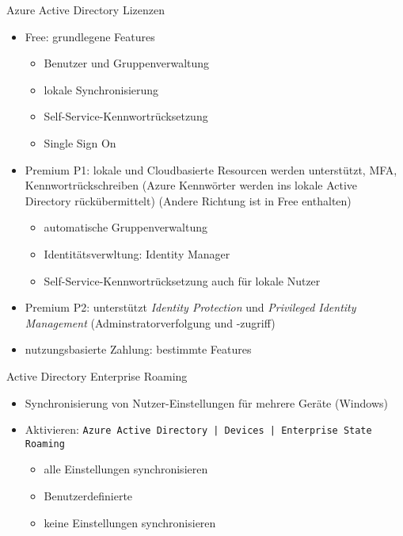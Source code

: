 
\begin{flashcard}[Definition]{Azure Active Directory Lizenzen}
    \begin{itemize}
        \item Free: grundlegene Features
            \begin{itemize}
                \item Benutzer und Gruppenverwaltung
                \item lokale Synchronisierung
                \item Self-Service-Kennwortrücksetzung
                \item Single Sign On
            \end{itemize}
        \item Premium P1: lokale und Cloudbasierte Resourcen werden unterstützt, MFA, Kennwortrückschreiben (Azure Kennwörter werden ins lokale Active Directory rückübermittelt) (Andere Richtung ist in Free enthalten)
            \begin{itemize}
                \item automatische Gruppenverwaltung
                \item Identitätsverwltung: Identity Manager
                \item Self-Service-Kennwortrücksetzung auch für lokale Nutzer
            \end{itemize}
        \item Premium P2:
                unterstützt \emph{Identity Protection} und \emph{Privileged Identity Management} (Adminstratorverfolgung und -zugriff)
        \item nutzungsbasierte Zahlung: bestimmte Features
    \end{itemize}
\end{flashcard}

\begin{flashcard}[Definition]{Active Directory Enterprise Roaming}
    \begin{itemize}
        \item Synchronisierung von Nutzer-Einstellungen für mehrere Geräte (Windows)
        \item Aktivieren:\newline
            \texttt{Azure Active Directory | Devices | Enterprise State Roaming}
            \begin{itemize}
                \item alle Einstellungen synchronisieren
                \item Benutzerdefinierte
                \item keine Einstellungen synchronisieren
            \end{itemize}
    \end{itemize}
\end{flashcard}

